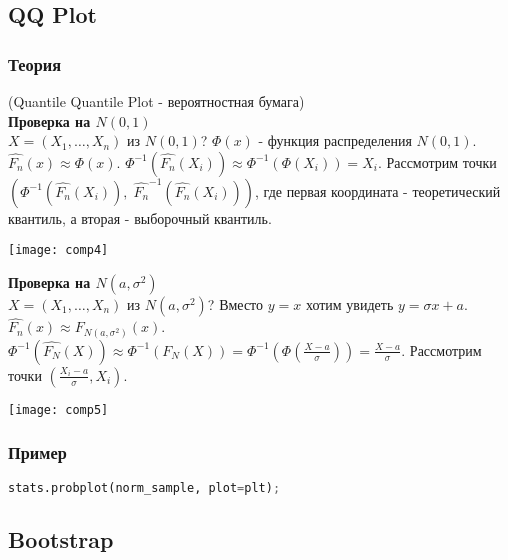 \subsection{QQ Plot}\label{cha:compl/sec:norm/subsec:qq}

\subsubsection*{Теория}\label{cha:compl/sec:norm/subsec:qq/subsubsection:theory}

(Quantile Quantile Plot - вероятностная бумага)\\

\textbf{Проверка на $N(0,1)$}\\

$X = (X_1, \dots, X_n)$ из $N(0,1)$? $\Phi (x)$ - функция распределения $N(0,1)$. $\hat{F_n}(x) \approx \Phi(x)$. $\Phi^{-1} (\hat{F_n} (X_i)) \approx \Phi^{-1} (\Phi (X_i)) = X_i$. Рассмотрим точки $\left( \Phi^{-1} (\hat{F_n} (X_i)), \; \hat{F_n}^{-1}(\hat{F_n}(X_i)) \right)$, где первая координата - теоретический квантиль, а вторая - выборочный квантиль.
\begin{center}
	\texttt{[image: comp4]}
\end{center}

\textbf{Проверка на $N(a,\sigma^2)$}\\

$X = (X_1, \dots, X_n)$ из $N(a,\sigma^2)$? Вместо $y=x$ хотим увидеть $y = \sigma x + a$. $\hat{F_n}(x) \approx F_{N(a, \sigma^2)}(x)$. $\Phi^{-1} (\hat{F_N} (X)) \approx \Phi^{-1} (F_N (X)) = \Phi^{-1} (\Phi (\frac{X-a}{\sigma})) = \frac{X - a}{\sigma}$. Рассмотрим точки $\left( \frac{X_i - a}{\sigma}, X_i \right)$.
\begin{center}
	\texttt{[image: comp5]}
\end{center}

\subsubsection*{Пример}\label{cha:compl/sec:nenorm/subsec:qq/subsubsection:prob}

\begin{lstlisting}[language=Python]
	stats.probplot(norm_sample, plot=plt);
\end{lstlisting}

\subsection{Bootstrap}\label{cha:compl/sec:norm/subsec:bootstrap}

